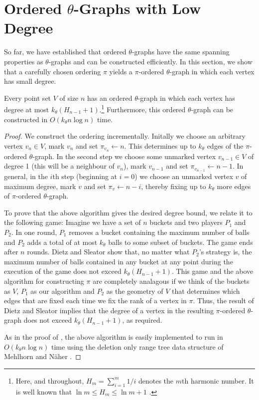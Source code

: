 \documentclass{elsart}
\begin{document}
\section{Ordered $\theta$-Graphs with Low Degree}

So far, we have established that ordered $\theta$-graphs have the same
spanning properties as $\theta$-graphs and can be constructed
efficiently.  In this section, we show that a carefully chosen
ordering $\pi$ yields a $\pi$-ordered $\theta$-graph in which each
vertex has small degree.


\begin{thm}
Every point set $V$ of size $n$ has an ordered $\theta$-graph in which
each vertex has degree at most $k_\theta(H_{n-1}+1)$.\footnote{Here,
and throughout, $H_m=\sum_{i=1}^m 1/i$ denotes the $m$th harmonic
number.  It is well known that $\ln m \le H_m \le \ln m + 1$
\cite{gkp94}.}  Furthermore, this ordered $\theta$-graph can be
constructed in $O(k_\theta n\log n)$ time.
\end{thm}

\begin{proof} 
We construct the ordering incrementally.  Initally we choose an
arbitrary vertex $v_n\in V$, mark $v_n$ and set $\pi_{v_n}\gets n$.
This determines up to $k_\theta$ edges of the $\pi$-ordered
$\theta$-graph.  In the second step we choose some unmarked vertex
$v_{n-1}\in V$ of degree 1 (this will be a neighbour of $v_n$), mark
$v_{n-1}$ and set $\pi_{v_{n-1}}\gets n-1$.  In general, in the $i$th
step (beginning at $i=0$) we choose an unmarked vertex $v$ of maximum
degree, mark $v$ and set $\pi_v\gets n-i$, thereby fixing up to
$k_\theta$ more edges of $\pi$-ordered $\theta$-graph.

To prove that the above algorithm gives the desired degree bound, we
relate it to the following game: Imagine we have a set of $n$ buckets
and two players $P_1$ and $P_2$.  In one round, $P_1$ removes a bucket
containing the maximum number of balls and $P_2$ adds a total of at
most $k_\theta$ balls to some subset of buckets.  The game ends after
$n$ rounds.  Dietz and Sleator \cite{ds87} show that, no matter what
$P_2$'s strategy is, the maximum number of balls contained in any
bucket at any point during the execution of the game does not exceed
$k_\theta(H_{n-1}+1)$.  This game and the above algorithm for
constructing $\pi$ are completely analagous if we think of the buckets
as $V$, $P_1$ as our algorithm and $P_2$ as the geometry of $V$ that
determines which edges that are fixed each time we fix the rank of a
vertex in $\pi$.  Thus, the result of Dietz and Sleator implies that
the degree of a vertex in the resulting $\pi$-ordered $\theta$-graph
does not exceed $k_\theta(H_{n-1}+1)$, as required.

As in the proof of , the above algorithm is
easily implemented to run in $O(k_\theta n\log n)$ time using the
deletion only range tree data structure of Mehlhorn and N\"aher
\cite{mn90}.
\end{proof}
\end{document}
